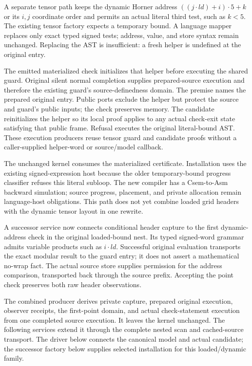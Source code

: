 A separate tensor path keeps the dynamic Horner address
$((j\cdot\mathit{ld})+i)\cdot5+k$ or its $i,j$ coordinate order and
permits an actual literal third test, such as $k<5$. The existing tensor
factory expects a temporary bound. A language mapper replaces only exact typed
signed tests; address, value, and store syntax remain unchanged. Replacing the
AST is insufficient: a fresh helper is undefined at the original entry.

The emitted materialized check initializes that helper before executing the
shared guard. Original silent normal completion supplies prepared-source
execution and therefore the existing guard's source-definedness domain.
The premise names the prepared original entry. Public ports exclude the helper
but protect the source and guard's public inputs; the check preserves memory.
The candidate reinitializes the helper so its local proof applies to any actual
check-exit state satisfying that public frame. Refusal executes the original
literal-bound AST. These execution producers reuse tensor guard and candidate
proofs without a caller-supplied helper-word or source/model callback.

The unchanged kernel consumes the materialized certificate. Installation uses
the existing signed-expression host because the older temporary-bound progress
classifier refuses this literal subloop. The new compiler has a Csem-to-Asm
backward simulation; source progress, placement, and private allocation remain
language-host obligations. This path does not yet combine loaded grid headers
with the dynamic tensor layout in one rewrite.

A successor service now connects conditional header capture to the first
dynamic-address check in the original loaded-bound nest. Its typed signed-word
grammar admits variable products such as $i\cdot\mathit{ld}$. Successful original
evaluation transports the exact modular result to the guard entry; it does not
assert a mathematical no-wrap fact. The actual source store supplies permission
for the address comparison, transported back through the source prefix.
Accepting the point check preserves both raw header observations.

The combined producer derives private capture, prepared original execution,
observer receipts, the first-point domain, and actual check-statement execution
from one completed source execution. It leaves the kernel unchanged. The
following services extend it through the complete nested scan and cached-source
transport. The driver below connects the canonical model and actual candidate;
the successor factory below supplies selected installation for this loaded/dynamic family.

